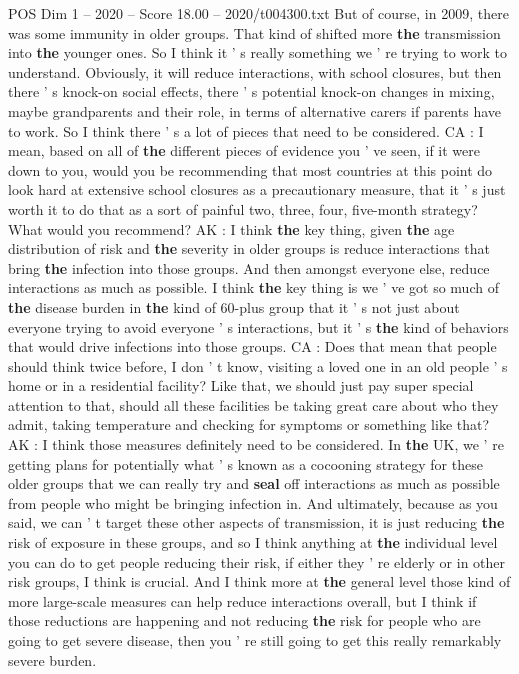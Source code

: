 \begin{textsample}{POS Dim 1 – 2020 – Score 18.00 – 2020/t004300.txt}
But of course, in 2009, there was some immunity in older groups.
That kind of shifted more \textbf{the} transmission into \textbf{the} younger ones.
So I think it ' s really something we ' re trying to work to understand.
Obviously, it will reduce interactions, with school closures, but then there ' s knock-on social effects, there ' s potential knock-on changes in mixing, maybe grandparents and their role, in terms of alternative carers if parents have to work.
So I think there ' s a lot of pieces that need to be considered.
CA : I mean, based on all of \textbf{the} different pieces of evidence you ' ve seen, if it were down to you, would you be recommending that most countries at this point do look hard at extensive school closures as a precautionary measure, that it ' s just worth it to do that as a sort of painful two, three, four, five-month strategy?
What would you recommend?
AK : I think \textbf{the} key thing, given \textbf{the} age distribution of risk and \textbf{the} severity in older groups is reduce interactions that bring \textbf{the} infection into those groups.
And then amongst everyone else, reduce interactions as much as possible.
I think \textbf{the} key thing is we ' ve got so much of \textbf{the} disease burden in \textbf{the} kind of 60-plus group that it ' s not just about everyone trying to avoid everyone ' s interactions, but it ' s \textbf{the} kind of behaviors that would drive infections into those groups.
CA : Does that mean that people should think twice before, I don ' t know, visiting a loved one in an old people ' s home or in a residential facility?
Like that, we should just pay super special attention to that, should all these facilities be taking great care about who they admit, taking temperature and checking for symptoms or something like that?
AK : I think those measures definitely need to be considered.
In \textbf{the} UK, we ' re getting plans for potentially what ' s known as a cocooning strategy for these older groups that we can really try and \textbf{seal} off interactions as much as possible from people who might be bringing infection in.
And ultimately, because as you said, we can ' t target these other aspects of transmission, it is just reducing \textbf{the} risk of exposure in these groups, and so I think anything at \textbf{the} individual level you can do to get people reducing their risk, if either they ' re elderly or in other risk groups, I think is crucial.
And I think more at \textbf{the} general level those kind of more large-scale measures can help reduce interactions overall, but I think if those reductions are happening and not reducing \textbf{the} risk for people who are going to get severe disease, then you ' re still going to get this really remarkably severe burden.

\end{textsample}
